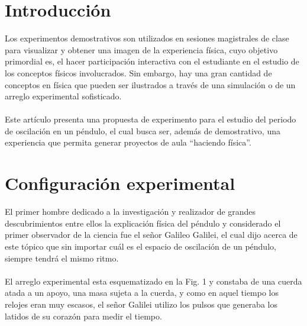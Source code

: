 \documentclass[12pt]{article}
\begin{document}
\renewcommand\contentsname{\centering TABLA DE CONTENIDO}
\thispagestyle{empty}
\setcounter{page}{1}
\tableofcontents
\clearpage




\begin{multicols}{2}

\section{Introducción}
Los experimentos demostrativos son utilizados en sesiones magistrales de clase para visualizar y obtener una imagen de la experiencia física, cuyo objetivo primordial es, el hacer participación interactiva con el estudiante\cite{REDISH} en el estudio de los conceptos físicos involucrados. Sin embargo, hay una gran cantidad de conceptos en física que pueden ser ilustrados a través de una simulación o de un arreglo experimental sofisticado.\\ \\ Este artículo presenta una propuesta de experimento para el estudio del periodo de oscilación en un péndulo, el cual busca ser, además de demostrativo, una experiencia que permita generar proyectos de aula ``haciendo física''.

\section{Configuración experimental}
El primer hombre dedicado a la investigación\cite{GALILEO} y realizador de grandes descubrimientos entre ellos la explicación física del péndulo y considerado el primer observador de la ciencia fue el señor Galileo Galilei, el cual dijo acerca de este tópico que sin importar cuál es el espacio de oscilación de un péndulo, siempre tendrá el mismo ritmo. 
\\ \\
El arreglo experimental esta esquematizado en la Fig. 1 y constaba de una cuerda atada a un apoyo, una masa sujeta a la cuerda, y como en aquel tiempo los relojes eran muy escasos, el señor Galilei\cite{GALILEO} utilizo los pulsos que generaba los latidos de su corazón para medir el tiempo.


\end{multicols}
\end{document}
